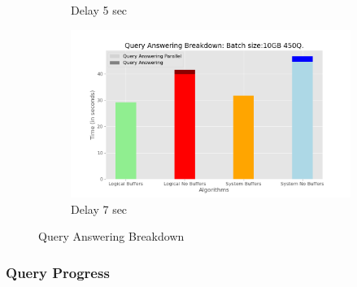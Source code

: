 \begin{figure}
\begin{subfigure}[c]{0.45\textwidth}
		\caption{Delay 5 sec}
		\label{fig:query-answering-breakdown-5}
	\end{subfigure}
	\begin{subfigure}[c]{0.45\textwidth}
		\includegraphics[width=1\textwidth]   {figures/Experiments/Dynamic/Breakdown/dataset_104857600_lockfree_Messi_Results_query_answering_breakdown_10485760_7.png}
		\caption{Delay 7 sec}
		\label{fig:query-answering-breakdown-7}
	\end{subfigure}
	\caption{Query Answering Breakdown}
	\label{query-answering-breakdown-random}
\end{figure}

\subsubsection{Query Progress}

